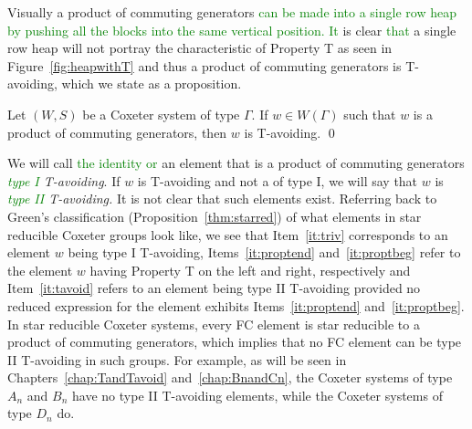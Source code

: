  Visually a product of commuting generators \textcolor{green}{can be made into a single row heap by pushing all the blocks into the same vertical position. It} is clear \textcolor{green}{that} a single row heap will not portray the characteristic of Property T as seen in Figure~\ref{fig:heapwithT} and thus a product of commuting generators is T-avoiding, which we state as a proposition.


\begin{proposition}\label{thm:trivTavoid}
Let $(W,S)$ be a Coxeter system of type $\Gamma$. If $w \in W(\Gamma)$ such that $w$ is a product of commuting generators, then $w$ is T-avoiding. \qed	
\end{proposition}

We will call \textcolor{green}{the identity or} an element that is a product of commuting generators \emph{\textcolor{green}{type I} T-avoiding}. If $w$ is T-avoiding and not a of type I, we will say that $w$ is \emph{\textcolor{green}{type II} T-avoiding.} It is not clear that such elements exist. Referring back to Green's classification (Proposition~\ref{thm:starred}) of what elements in star reducible Coxeter groups look like, we see that Item~\ref{it:triv} corresponds to an element $w$ being type I T-avoiding, Items~\ref{it:proptend} and~\ref{it:proptbeg} refer to the element $w$ having Property T on the left and right, respectively and Item~\ref{it:tavoid} refers to an element being type II T-avoiding provided no reduced expression for the element exhibits Items~\ref{it:proptend} and~\ref{it:proptbeg}. In star reducible Coxeter systems, every FC element is star reducible to a product of commuting generators, which implies that no FC element can be type II T-avoiding in such groups. For example, as will be seen in Chapters~\ref{chap:TandTavoid} and~\ref{chap:BnandCn}, the Coxeter systems of type $A_n$ and $B_n$ have no type II T-avoiding elements, while the Coxeter systems of type $D_n$ do.


